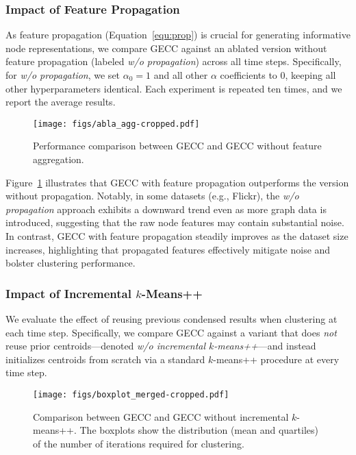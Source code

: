 \subsubsection{Impact of Feature Propagation}
As feature propagation (Equation~\ref{equ:prop}) is crucial for generating informative node representations, we compare \textsc{GECC} against an ablated version without feature propagation (labeled \emph{w/o propagation}) across all time steps. Specifically, for \emph{w/o propagation}, we set \(\alpha_{0}=1\) and all other \(\alpha\) coefficients to \(0\), keeping all other hyperparameters identical. Each experiment is repeated ten times, and we report the average results.

\begin{figure}[h]
    \centering
    \texttt{[image: figs/abla\_agg-cropped.pdf]}
    \caption{Performance comparison between \textsc{GECC} and \textsc{GECC} without feature aggregation.}
    \label{fig:abla-prop}
\end{figure}

Figure~\ref{fig:abla-prop} illustrates that \textsc{GECC} with feature propagation outperforms the version without propagation. Notably, in some datasets (e.g., Flickr), the \emph{w/o propagation} approach exhibits a downward trend even as more graph data is introduced, suggesting that the raw node features may contain substantial noise. In contrast, \textsc{GECC} with feature propagation steadily improves as the dataset size increases, highlighting that propagated features effectively mitigate noise and bolster clustering performance.

\subsubsection{Impact of Incremental \(k\)-Means++}
We evaluate the effect of reusing previous condensed results when clustering at each time step. Specifically, we compare \textsc{GECC} against a variant that does \emph{not} reuse prior centroids---denoted \textit{w/o incremental \(k\)-means++}---and instead initializes centroids from scratch via a standard \(k\)-means++ procedure at every time step.
\begin{figure}[h]
    \centering
    \texttt{[image: figs/boxplot\_merged-cropped.pdf]}
    \caption{Comparison between \textsc{GECC} and \textsc{GECC} without incremental \(k\)-means++. 
    The boxplots show the distribution (mean and quartiles) of the number of iterations required for clustering.}
    \label{fig:abla-incrementalkmeans++}
\end{figure}


